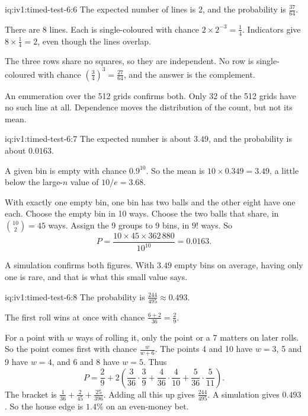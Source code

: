 \begin{solution}{iq:iv1:timed-test-6:6}
The expected number of lines is 2, and the probability is $\frac{37}{64}$.

There are 8 lines. Each is single-coloured with chance $2 \times 2^{-3} = \frac14$. Indicators give $8 \times \frac14 = 2$, even though the lines overlap.

The three rows share no squares, so they are independent. No row is single-coloured with chance $(\frac34)^3 = \frac{27}{64}$, and the answer is the complement.

An enumeration over the 512 grids confirms both. Only 32 of the 512 grids have no such line at all. Dependence moves the distribution of the count, but not its mean.

\end{solution}

\begin{solution}{iq:iv1:timed-test-6:7}
The expected number is about $3.49$, and the probability is about $0.0163$.

A given bin is empty with chance $0.9^{10}$. So the mean is $10 \times 0.349 = 3.49$, a little below the large-$n$ value of $10/e = 3.68$.

With exactly one empty bin, one bin has two balls and the other eight have one each. Choose the empty bin in 10 ways. Choose the two balls that share, in $\binom{10}{2} = 45$ ways. Assign the 9 groups to 9 bins, in $9!$ ways. So
\[
P = \frac{10 \times 45 \times 362\,880}{10^{10}} = 0.0163.
\]

A simulation confirms both figures. With $3.49$ empty bins on average, having only one is rare, and that is what this small value says.

\end{solution}

\begin{solution}{iq:iv1:timed-test-6:8}
The probability is $\frac{244}{495} \approx 0.493$.

The first roll wins at once with chance $\frac{6 + 2}{36} = \frac29$.

For a point with $w$ ways of rolling it, only the point or a 7 matters on later rolls. So the point comes first with chance $\frac{w}{w + 6}$. The points 4 and 10 have $w = 3$, 5 and 9 have $w = 4$, and 6 and 8 have $w = 5$. Thus
\[
P = \frac29 + 2\left(\frac{3}{36} \cdot \frac39 + \frac{4}{36} \cdot \frac{4}{10} + \frac{5}{36} \cdot \frac{5}{11}\right).
\]
The bracket is $\frac{1}{36} + \frac{2}{45} + \frac{25}{396}$. Adding all this up gives $\frac{244}{495}$. A simulation gives $0.493$. So the house edge is $1.4\%$ on an even-money bet.

\end{solution}

